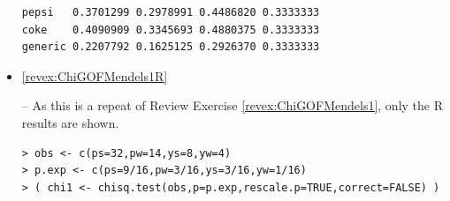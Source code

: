 \documentclass[10pt,openany]{book}\usepackage[]{graphicx}\usepackage[]{color}
\makeatletter
\newenvironment{kframe}{%
 \def\at@end@of@kframe{}%
 \ifinner\ifhmode%
  \def\at@end@of@kframe{\end{minipage}}%
  \begin{minipage}{\columnwidth}%
 \fi\fi%
 \def\FrameCommand##1{\hskip\@totalleftmargin \hskip-\fboxsep
 \colorbox{shadecolor}{##1}\hskip-\fboxsep
     \hskip-\linewidth \hskip-\@totalleftmargin \hskip\columnwidth}%
 \MakeFramed {\advance\hsize-\width
   \@totalleftmargin\z@ \linewidth\hsize
   \@setminipage}}%
 {\par\unskip\endMakeFramed%
 \at@end@of@kframe}
\newenvironment{knitrout}{}{} %
\makeatother
\begin{document}
\begin{itemize}
\begin{knitrout}
\begin{kframe}
\begin{verbatim}
pepsi   0.3701299 0.2978991 0.4486820 0.3333333
coke    0.4090909 0.3345693 0.4880375 0.3333333
generic 0.2207792 0.1625125 0.2926370 0.3333333
\end{verbatim}
\end{kframe}
\end{knitrout}
  \item \hypertarget{ans:ChiGOFMendels1R}{\ref{revex:ChiGOFMendels1R}} -- As this is a repeat of Review Exercise \ref{revex:ChiGOFMendels1}, only the R results are shown.
\begin{knitrout}
\color{fgcolor}\begin{kframe}
\begin{verbatim}
> obs <- c(ps=32,pw=14,ys=8,yw=4)
> p.exp <- c(ps=9/16,pw=3/16,ys=3/16,yw=1/16)
> ( chi1 <- chisq.test(obs,p=p.exp,rescale.p=TRUE,correct=FALSE) )
\end{verbatim}



\end{kframe}
\end{knitrout}
\end{itemize}
\end{document}
